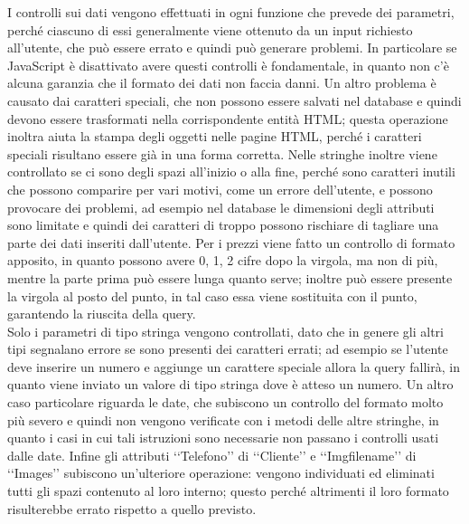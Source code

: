 {{		I controlli sui dati vengono effettuati in ogni funzione che prevede dei parametri, perché ciascuno di essi generalmente viene ottenuto da un input richiesto all'utente, che può essere errato e quindi può generare problemi. In particolare se JavaScript è disattivato avere questi controlli è fondamentale, in quanto non c'è alcuna garanzia che il formato dei dati non faccia danni. Un altro problema è causato dai caratteri speciali, che non possono essere salvati nel database e quindi devono essere trasformati nella corrispondente entità HTML; questa operazione inoltra aiuta la stampa degli oggetti nelle pagine HTML, perché i caratteri speciali risultano essere già in una forma corretta. Nelle stringhe inoltre viene controllato se ci sono degli spazi all'inizio o alla fine, perché sono caratteri inutili che possono comparire per vari motivi, come un errore dell'utente, e possono provocare dei problemi, ad esempio nel database le dimensioni degli attributi sono limitate e quindi dei caratteri di troppo possono rischiare di tagliare una parte dei dati inseriti dall'utente. Per i prezzi viene fatto un controllo di formato apposito, in quanto possono avere 0, 1, 2 cifre dopo la virgola, ma non di più, mentre la parte prima può essere lunga quanto serve; inoltre può essere presente la virgola al posto del punto, in tal caso essa viene sostituita con il punto, garantendo la riuscita della query.\\
		Solo i parametri di tipo stringa vengono controllati, dato che in genere gli altri tipi segnalano errore se sono presenti dei caratteri errati; ad esempio se l'utente deve inserire un numero e aggiunge un carattere speciale allora la query fallirà, in quanto viene inviato un valore di tipo stringa dove è atteso un numero. Un altro caso particolare riguarda le date, che subiscono un controllo del formato molto più severo e quindi non vengono verificate con i metodi delle altre stringhe, in quanto i casi in cui tali istruzioni sono necessarie non passano i controlli usati dalle date. Infine gli attributi ‘‘Telefono’’ di ‘‘Cliente’’ e ‘‘Img\textunderscore filename’’ di ‘‘Images’’ subiscono un'ulteriore operazione: vengono individuati ed eliminati tutti gli spazi contenuto al loro interno; questo perché altrimenti il loro formato risulterebbe errato rispetto a quello previsto.
	}
}